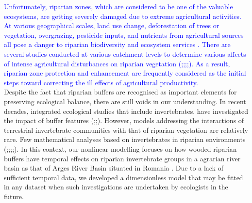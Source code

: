 \documentclass[12pt]{article}
\numberwithin{equation}{section}
\begin{document}
\textcolor{blue}{Unfortunately, riparian zones, which are considered to be one of the valuable ecosystems, are getting severely damaged due to extreme agricultural activities. At various geographical scales, land use change, deforestation of trees or vegetation, overgrazing, pesticide inputs, and nutrients from agricultural sources all pose a danger to riparian biodiversity and ecosystem services \cite{burdon2013habitat}. There are several studies conducted at various catchment levels to determine various affects of intense agricultural disturbances on riparian vegetation (\cite{cesarini2022riparian};\cite{alemu2018identifying};\cite{heartsill2003riparian};\cite{corbacho2003patterns};\cite{schlosser1981riparian}). As a result, riparian zone protection and enhancement are frequently considered as the initial steps toward correcting the ill effects of agricultural productivity.}\\
Despite the fact that riparian buffers are recognised as important elements for preserving ecological balance, there are still voids in our understanding. In recent decades, integrated ecological studies that include invertebrates, have investigated the impact of buffer features (\cite{forio2020small};\cite{flory1999};\cite{kawaguchi2001}). However, models addressing the interactions of terrestrial invertebrate communities with that of riparian vegetation are relatively rare. Few mathematical analyses based on invertebrates in riparian environments (\cite{steward2022};\cite{wipfli1997};\cite{sabo2002};\cite{you2015};\cite{burdon2020}). In this context, our nonlinear modelling focuses on how wooded riparian buffers have temporal effects on riparian invertebrate groups in a agrarian river basin as that of Arges River Basin situated in Romania \cite{popescu2021riparian}. Due to a lack of sufficient temporal data, we developed a dimensionless model that may be fitted in any dataset when such investigations are undertaken by ecologists in the future.\\
\end{document}

